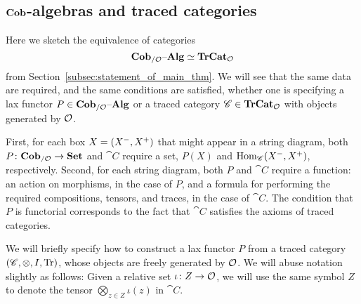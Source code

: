 \documentclass[11pt,oneside,article]{memoir}
\begin{document}
\subsection{$\mathbf{Cob}$-algebras and traced categories}\label{subsec:cobalg_and_trCat}

Here we sketch the equivalence of categories
\begin{equation*}
   \mathbf{Cob}_{/\mathcal{O}}{\text \textendash}\mathbf{Alg}\simeq\mathbf{TrCat}_{\mathcal{O}}
\end{equation*}
from Section~\ref{subsec:statement_of_main_thm}. We will see that the same data are required, and
the same conditions are satisfied, whether one is specifying a lax functor $P\in\mathbf{Cob}_{/\mathcal{O}}{\text \textendash}\mathbf{Alg}$
or a traced category $\mathscr{C}\in\mathbf{TrCat}_{\mathcal{O}}$ with objects generated by $\mathcal{O}$.

First, for each box $X=(X^-,X^+)$ that might appear in a string diagram, both $P\colon\mathbf{Cob}_{/\mathcal{O}}\to\mathbf{Set}$ and
$\cat{C}$ require a set, $P(X)$ and $\operatorname{Hom}_{\mathscr{C}}(X^-,X^+)$, respectively.
Second, for each string diagram, both $P$ and $\cat{C}$ require a function: an action on morphisms,
in the case of $P$, and a formula for performing the required compositions, tensors, and traces, in
the case of $\cat{C}$. The condition that $P$ is functorial corresponds to the fact that $\cat{C}$
satisfies the axioms of traced categories.

We will briefly specify how to construct a lax functor $P$ from a traced category $(\mathscr{C},\otimes,I,\operatorname{Tr})$, whose objects are freely generated by $\mathcal{O}$. We will abuse notation slightly as follows: Given a relative set
$\iota\colon Z\to\mathcal{O}$, we will use the same symbol $Z$ to denote
the tensor $\bigotimes_{z\in Z}\iota(z)$ in $\cat{C}$.
\end{document}
